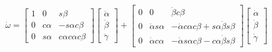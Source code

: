 \[
\dot{\omega} =
\begin{bmatrix}
1 & 0 & s\beta \\
0 & c\alpha & -s\alpha c\beta \\
0 & s\alpha & c\alpha c\alpha c\beta 
\end{bmatrix}
\begin{bmatrix}
\ddot{\alpha} \\
\ddot{\beta}\\
\ddot{\gamma}
\end{bmatrix}
+
\begin{bmatrix}
0 & 0 & \dot{\beta}c\beta \\
0 & \dot{\alpha} s\alpha & -\dot{\alpha} c\alpha c\beta + s\alpha \dot{\beta} s\beta \\
0 & \dot{\alpha}c\alpha & -\dot{\alpha}s\alpha c\beta - c\alpha \dot{\beta}s\beta
\end{bmatrix}
\begin{bmatrix}
\dot{\alpha} \\
\dot{\beta}\\
\dot{\gamma}
\end{bmatrix}
\]
